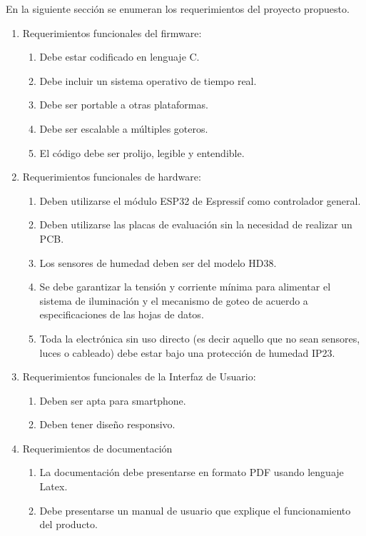 \documentclass[
11pt, %
]{charter}
\begin{document}
En la siguiente sección se enumeran los requerimientos del proyecto propuesto.
\begin{enumerate}
	\item Requerimientos funcionales del firmware:
		\begin{enumerate}
			\item Debe estar codificado en lenguaje C.
			\item Debe incluir un sistema operativo de tiempo real.
			\item Debe ser portable a otras plataformas.
			\item Debe ser escalable a múltiples goteros.
			\item El código debe ser prolijo, legible y entendible.
		\end{enumerate}
	\item Requerimientos funcionales de hardware:
		\begin{enumerate}
			\item Deben utilizarse el módulo ESP32 de Espressif como controlador general.
			\item Deben utilizarse las placas de evaluación sin la necesidad de realizar un PCB.
			\item Los sensores de humedad deben ser del modelo HD38.
			\item Se debe garantizar la tensión y corriente mínima para alimentar el sistema de iluminación y el mecanismo de goteo de acuerdo a especificaciones de las hojas de datos.
			\item Toda la electrónica sin uso directo (es decir aquello que no sean sensores, luces o cableado) debe estar bajo una protección de humedad IP23.
		\end{enumerate}
	\item Requerimientos funcionales de la Interfaz de Usuario:
		\begin{enumerate}
			\item Deben ser apta para smartphone.
			\item Deben tener diseño responsivo.
		\end{enumerate}
	\item Requerimientos de documentación
		\begin{enumerate}
			\item La documentación debe presentarse en formato PDF usando lenguaje Latex.
			\item Debe presentarse un manual de usuario que explique el funcionamiento del producto.
		\end{enumerate}
\end{enumerate}
\end{document}
